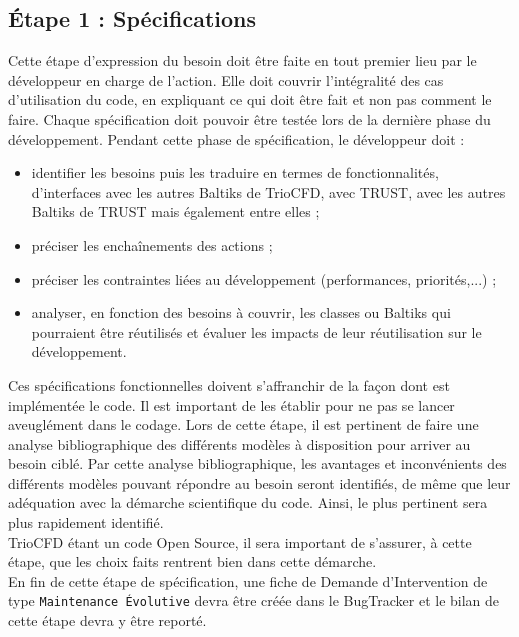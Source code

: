 \subsection{\label{subsec:specif}Étape 1 : Sp\'ecifications}
Cette étape d'expression du besoin doit être faite en tout premier lieu par le développeur en charge de l'action. Elle doit couvrir l'intégralité des cas d'utilisation du code, en expliquant ce qui doit être fait et non pas comment le faire. Chaque spécification doit pouvoir être testée lors de la dernière phase du développement.
Pendant cette phase de spécification, le développeur doit :
\begin{itemize}[label=$\Rightarrow$, font=\LARGE]
   \item identifier les besoins puis les traduire en termes de fonctionnalités, d'interfaces avec les autres Baltiks de TrioCFD, avec TRUST, avec les autres Baltiks de TRUST mais également entre elles ;
   \item préciser les enchaînements des actions ;
   \item préciser les contraintes liées au développement (performances, priorités,...) ;
   \item analyser, en fonction des besoins à couvrir, les classes ou Baltiks qui pourraient être réutilisés et évaluer les impacts de leur réutilisation sur le développement.
\end{itemize}

Ces spécifications fonctionnelles doivent s'affranchir de la façon dont est implémentée le code. Il est important de les établir pour ne pas se lancer aveuglément dans le codage. \newpage
Lors de cette étape, il est pertinent de faire une analyse bibliographique des différents modèles à disposition pour arriver au besoin ciblé. Par cette analyse bibliographique, les avantages et inconvénients des différents modèles pouvant répondre au besoin seront identifiés, de même que leur adéquation avec la démarche scientifique du code. Ainsi, le plus pertinent sera plus rapidement identifié.\\
TrioCFD étant un code Open Source, il sera important de s'assurer, à cette étape, que les choix faits rentrent bien dans cette démarche.\\
En fin de cette étape de spécification, une fiche de Demande d'Intervention de type \texttt{Maintenance Évolutive} devra être créée dans le BugTracker et le bilan de cette étape devra y être reporté.
